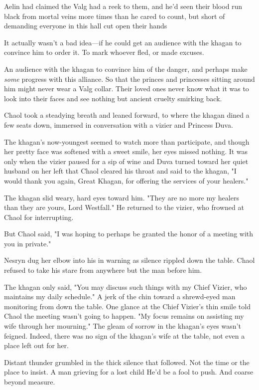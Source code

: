 Aelin had claimed the Valg had a reek to them, and he'd seen their blood run black from mortal veins more times than he cared to count, but short of demanding everyone in this hall cut open their hands 

It actually wasn't a bad idea---if he could get an audience with the khagan to convince him to order it. To mark whoever fled, or made excuses.

An audience with the khagan to convince him of the danger, and perhaps make \emph{some} progress with this alliance. So that the princes and princesses sitting around him might never wear a Valg collar. Their loved ones never know what it was to look into their faces and see nothing but ancient cruelty smirking back.

Chaol took a steadying breath and leaned forward, to where the khagan dined a few seats down, immersed in conversation with a vizier and Princess Duva.

The khagan's now-youngest seemed to watch more than participate, and though her pretty face was softened with a sweet smile, her eyes missed nothing. It was only when the vizier paused for a sip of wine and Duva turned toward her quiet husband on her left that Chaol cleared his throat and said to the khagan, "I would thank you again, Great Khagan, for offering the services of your healers."

The khagan slid weary, hard eyes toward him. "They are no more my healers than they are yours, Lord Westfall." He returned to the vizier, who frowned at Chaol for interrupting.

But Chaol said, "I was hoping to perhaps be granted the honor of a meeting with you in private."

Nesryn dug her elbow into his in warning as silence rippled down the table. Chaol refused to take his stare from anywhere but the man before him.

The khagan only said, "You may discuss such things with my Chief Vizier, who maintains my daily schedule." A jerk of the chin toward a shrewd-eyed man monitoring from down the table. One glance at the Chief Vizier's thin smile told Chaol the meeting wasn't going to happen. "My focus remains on assisting my wife through her mourning." The gleam of sorrow in the khagan's eyes wasn't feigned. Indeed, there was no sign of the khagan's wife at the table, not even a place left out for her.

Distant thunder grumbled in the thick silence that followed. Not the time or the place to insist. A man grieving for a lost child 
He'd be a fool to push. And coarse beyond measure.

